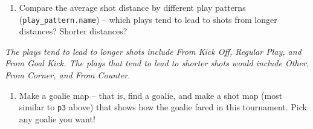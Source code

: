 \documentclass[]{article}
\newenvironment{Shaded}{\begin{snugshade}}{\end{snugshade}}
\newcommand{\DataTypeTok}[1]{\textcolor[rgb]{0.13,0.29,0.53}{#1}}
\newcommand{\KeywordTok}[1]{\textcolor[rgb]{0.13,0.29,0.53}{\textbf{#1}}}
\newcommand{\NormalTok}[1]{#1}
\newcommand{\OperatorTok}[1]{\textcolor[rgb]{0.81,0.36,0.00}{\textbf{#1}}}
\newcommand{\StringTok}[1]{\textcolor[rgb]{0.31,0.60,0.02}{#1}}
\providecommand{\tightlist}{%
  \setlength{\itemsep}{0pt}\setlength{\parskip}{0pt}}
\begin{document}
\begin{enumerate}
\def\labelenumi{\arabic{enumi}.}
\setcounter{enumi}{12}
\tightlist
\item
  Compare the average shot distance by different play patterns
  (\texttt{play\_pattern.name}) -- which plays tend to lead to shots
  from longer distances? Shorter distances?
\end{enumerate}

\begin{Shaded}
\end{Shaded}

\emph{The plays tend to lead to longer shots include From Kick Off,
Regular Play, and From Goal Kick. The plays that tend to lead to shorter
shots would include Other, From Corner, and From Counter.}

\begin{enumerate}
\def\labelenumi{\arabic{enumi}.}
\setcounter{enumi}{13}
\tightlist
\item
  Make a goalie map -- that is, find a goalie, and make a shot map (most
  similar to \texttt{p3} above) that shows how the goalie fared in this
  tournament. Pick any goalie you want!
\end{enumerate}

\begin{Shaded}
\end{Shaded}
\end{document}
